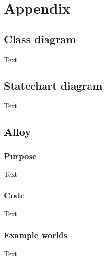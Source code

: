 \section{Appendix}
\subsection{Class diagram}
Text
\subsection{Statechart diagram}
Text
\subsection{Alloy}

\subsubsection{Purpose}
Text
\subsubsection{Code}
Text
\subsubsection{Example worlds}
Text